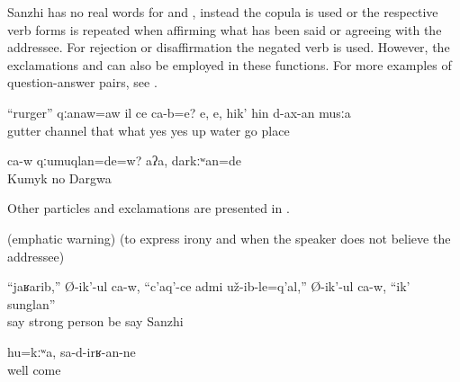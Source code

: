 Sanzhi has no real words for  and , instead the copula  is used or the respective verb forms is repeated when affirming what has been said or agreeing with the addressee. For rejection or disaffirmation the negated verb is used. However, the exclamations   and   can also be employed in these functions. For more examples of question-answer pairs, see .
%
\begin{exe}
	\ex	\label{ex:‎Gutter (ruger), this is a channel or what is it? Yes, the place where the water runs (to the water mill) minor}
	\gll	``rurger''	qːanaw=aw	il	ce	ca-b=e? e,	e,	hik'	hin	d-ax-an	musːa\\
		gutter	channel	that	what		yes	yes	up	water	go	place\\
	\glt	{}

	\ex	\label{ex:‎‎‎Was he himself Kumyk? ‎‎No, he was Dargi minor}
	\gll	ca-w	qːumuqlan=de=w?	aʔa,	darkːʷan=de\\
			Kumyk	no	Dargwa\\
	\glt	{}
\end{exe}

Other particles and exclamations are presented in .
%
\begin{exe}
	\ex	\label{ex:exclamations minor}
	\begin{xlist}
		\ex	{} 	
		\ex	{} 	
		\ex	{} 	
		\ex	{}  (emphatic warning)	
		\ex	{}  (to express irony and when the speaker does not believe the addressee)	
	\end{xlist}

	\ex	\label{ex:‎Oh, it turned out that the Sanzhi person is such a strong man, he says minor}
	\gll	``jaʁarib,''	Ø-ik'-ul ca-w,	``c'aq'-ce	admi	už-ib-le=q'al,''	Ø-ik'-ul ca-w,	``ik'	sunglan''\\
			say		strong	person	be	say			Sanzhi\\
	\glt	{}

	\ex	\label{ex:Well, (whatever, it does not matter), they will come (another day) minor}
	\gll	hu=kːʷa,	sa-d-irʁ-an-ne\\
		well	come\\
	\glt	{}
\end{exe}

